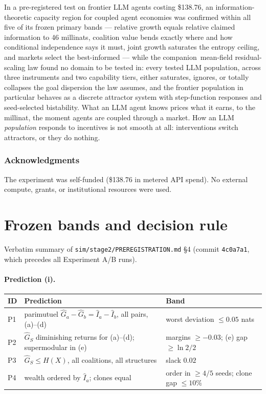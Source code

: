 \documentclass{article} %
\newif\ifanon
\newcommand{\Ihat}{\hat{I}}
\newcommand{\Ghat}{\hat{G}}
\begin{document}
In a pre-registered test on frontier LLM agents costing \$138.76, an information-theoretic capacity region for coupled agent economies was confirmed within all five of its frozen primary bands --- relative growth equals relative claimed information to 46 millinats, coalition value bends exactly where and how conditional independence says it must, joint growth saturates the entropy ceiling, and markets select the best-informed --- while the \ifanon paired\else companion\fi\ mean-field residual-scaling law found no domain to be tested in: every tested LLM population, across three instruments and two capability tiers, either saturates, ignores, or totally collapses the goal dispersion the law assumes, and the frontier population in particular behaves as a discrete attractor system with step-function responses and seed-selected bistability. What an LLM agent knows prices what it earns, to the millinat, the moment agents are coupled through a market. How an LLM \emph{population} responds to incentives is not smooth at all: interventions switch attractors, or they do nothing.

\ifanon\else
\subsubsection*{Acknowledgments}
The experiment was self-funded (\$138.76 in metered API spend). No external compute, grants, or institutional resources were used.
\fi




\appendix

\section{Frozen bands and decision rule}
\label{app:bands}

Verbatim summary of \texttt{sim/stage2/PREREGISTRATION.md} \S4 (commit \texttt{4c0a7a1}, which precedes all Experiment A/B runs).

\paragraph{Prediction (i).}
\begin{center}
\small
\begin{tabular}{@{}lll@{}}
\toprule
ID & Prediction & Band \\
\midrule
P1 & parimutuel $\Ghat_a - \Ghat_b = \Ihat_a - \Ihat_b$, all pairs, (a)--(d) & worst deviation $\leq 0.05$ nats \\
P2 & $\Ghat_S$ diminishing returns for (a)--(d); supermodular in (e) & margins $\geq -0.03$; (e) gap $\geq \ln2/2$ \\
P3 & $\Ghat_S \leq H(X)$, all coalitions, all structures & slack $0.02$ \\
P4 & wealth ordered by $\Ihat_a$; clones equal & order in $\geq 4/5$ seeds; clone gap $\leq 10\%$ \\
\bottomrule
\end{tabular}
\end{center}
\end{document}
